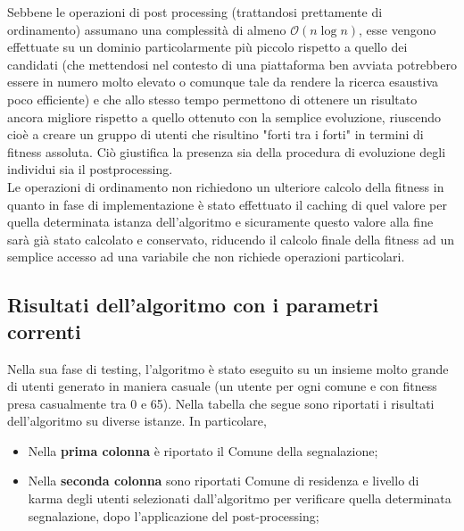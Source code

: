             Sebbene le operazioni di post processing (trattandosi prettamente di ordinamento) assumano una complessità di almeno $\mathcal{O}(n\log{}n)$, esse vengono effettuate su un dominio particolarmente più piccolo rispetto a quello dei candidati (che mettendosi nel contesto di una piattaforma ben avviata potrebbero essere in numero molto elevato o comunque tale da rendere la ricerca esaustiva poco efficiente) e che allo stesso tempo permettono di ottenere un risultato ancora migliore rispetto a quello ottenuto con la semplice evoluzione, riuscendo cioè a creare un gruppo di utenti che risultino "forti tra i forti" in termini di fitness assoluta. Ciò giustifica la presenza sia della procedura di evoluzione degli individui sia il postprocessing. \\ 
            Le operazioni di ordinamento non richiedono un ulteriore calcolo della fitness in quanto in fase di implementazione è stato effettuato il caching di quel valore per quella determinata istanza dell'algoritmo e sicuramente questo valore alla fine sarà già stato calcolato e conservato, riducendo il calcolo finale della fitness ad un semplice accesso ad una variabile che non richiede operazioni particolari.


    \subsection{Risultati dell'algoritmo con i parametri correnti}
        Nella sua fase di testing, l'algoritmo è stato eseguito su un insieme molto grande di utenti generato in maniera casuale (un utente per ogni comune e con fitness presa casualmente tra 0 e 65). Nella tabella che segue sono riportati i risultati dell'algoritmo su diverse istanze. In particolare, 

        \begin{itemize}
            \item Nella \textbf{prima colonna} è riportato il Comune della segnalazione;
            \item Nella \textbf{seconda colonna} sono riportati Comune di residenza e livello di karma degli utenti selezionati dall'algoritmo per verificare quella determinata segnalazione, dopo l'applicazione del post-processing;
        \end{itemize}

